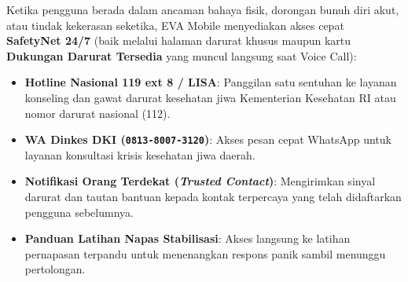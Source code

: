 Ketika pengguna berada dalam ancaman bahaya fisik, dorongan bunuh diri akut, atau tindak kekerasan seketika, EVA Mobile menyediakan akses cepat \textbf{SafetyNet 24/7} (baik melalui halaman darurat khusus maupun kartu \textbf{Dukungan Darurat Tersedia} yang muncul langsung saat Voice Call):
\begin{itemize}[leftmargin=1.4em]
  \item \textbf{Hotline Nasional 119 ext 8 / LISA}: Panggilan satu sentuhan ke layanan konseling dan gawat darurat kesehatan jiwa Kementerian Kesehatan RI atau nomor darurat nasional (112).
  \item \textbf{WA Dinkes DKI (\texttt{0813-8007-3120})}: Akses pesan cepat WhatsApp untuk layanan konsultasi krisis kesehatan jiwa daerah.
  \item \textbf{Notifikasi Orang Terdekat (\textit{Trusted Contact})}: Mengirimkan sinyal darurat dan tautan bantuan kepada kontak terpercaya yang telah didaftarkan pengguna sebelumnya.
  \item \textbf{Panduan Latihan Napas Stabilisasi}: Akses langsung ke latihan pernapasan terpandu untuk menenangkan respons panik sambil menunggu pertolongan.
\end{itemize}

